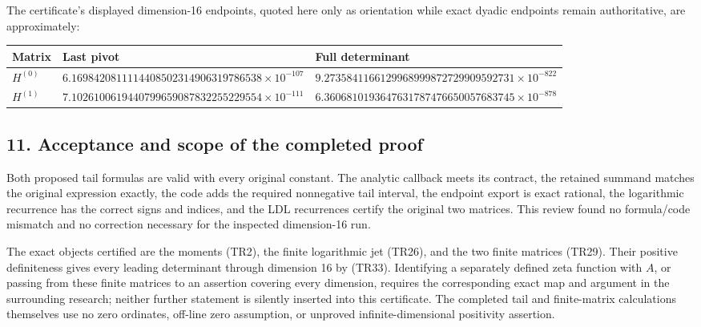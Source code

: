 The certificate's displayed dimension-16 endpoints, quoted here only as orientation while exact dyadic endpoints remain authoritative, are approximately:

{\scriptsize{} %
\begin{longtable}[]{@{}
  >{\raggedright\arraybackslash}p{}
  >{\raggedleft\arraybackslash}p{}
  >{\raggedleft\arraybackslash}p{}@{}}
\toprule\noalign{}
\begin{minipage}[b]{\linewidth}\raggedright
Matrix
\end{minipage} & \begin{minipage}[b]{\linewidth}\raggedleft
Last pivot
\end{minipage} & \begin{minipage}[b]{\linewidth}\raggedleft
Full determinant
\end{minipage} \\
\midrule\noalign{}
\endhead
\bottomrule\noalign{}
\endlastfoot
\(H^{(0)}\) & \(6.1698420811114408502314906319786538\times10^{-107}\) & \(9.2735841166129968999872729909592731\times10^{-822}\) \\
\(H^{(1)}\) & \(7.1026100619440799659087832255229554\times10^{-111}\) & \(6.3606810193647631787476650057683745\times10^{-878}\) \\
\end{longtable}
}

\subsection{11. Acceptance and scope of the completed proof}\label{C47stage:TR:acceptance-and-scope-of-the-completed-proof}

Both proposed tail formulas are valid with every original constant. The analytic callback meets its contract, the retained summand matches the original expression exactly, the code adds the required nonnegative tail interval, the endpoint export is exact rational, the logarithmic recurrence has the correct signs and indices, and the LDL recurrences certify the original two matrices. This review found no formula/code mismatch and no correction necessary for the inspected dimension-16 run.

The exact objects certified are the moments (TR2), the finite logarithmic jet (TR26), and the two finite matrices (TR29). Their positive definiteness gives every leading determinant through dimension 16 by (TR33). Identifying a separately defined zeta function with \(A\), or passing from these finite matrices to an assertion covering every dimension, requires the corresponding exact map and argument in the surrounding research; neither further statement is silently inserted into this certificate. The completed tail and finite-matrix calculations themselves use no zero ordinates, off-line zero assumption, or unproved infinite-dimensional positivity assertion.
